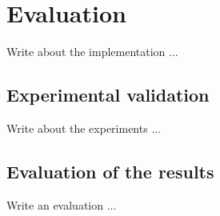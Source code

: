\chapter{Evaluation}
\label{cha:implementation}
\vspace{0.5 cm} 

Write about the implementation ...

\vspace{0.5 cm} 
\section{Experimental validation}
\label{sec:evalres}
\vspace{0.5 cm} 

Write about the experiments ...


\vspace{0.5 cm} 
\section{Evaluation of the results}
\label{sec:evalres}
\vspace{0.5 cm} 

Write an evaluation ...

